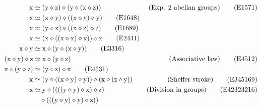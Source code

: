 \begin{align}
        \x &\formaleq (\y \op \z) \op (\y \op (\x \op \z)) & \hbox{(Exp. $2$ abelian groups)} \label{eq1571}\tag{E1571} \\
        \x &\formaleq (\x \op \y) \op ((\x \op \y) \op \y) \label{eq1648}\tag{E1648} \\
        \x &\formaleq (\y \op \x) \op ((\x \op \z) \op \z) \label{eq1689}\tag{E1689} \\
        \x &\formaleq (\x \op ((\x \op \x) \op \x)) \op \x \label{eq2441}\tag{E2441} \\
        \x \op \y &\formaleq \x \op (\y \op (\x \op \y)) \label{eq3316}\tag{E3316} \\
        (\x \op \y) \op \z &\formaleq \x \op (\y \op \z) &\hbox{(Associative law)} \label{eq4512}\tag{E4512}\\
        \x \op (\y \op \z) &\formaleq (\y \op \z) \op \x \label{eq4531}\tag{E4531} \\
        \x &\formaleq (\y \op ((\x \op \y) \op \y)) \op (\x \op (\z \op \y)) & \hbox{(Sheffer stroke)} \label{eq345169}\tag{E345169} \\
        \x &\formaleq \y \op ((((\y \op \y) \op \x) \op \z) & \hbox{(Division in groups)} \label{eq42323216}\tag{E42323216} \\
        & \quad  \op (((\y \op \y) \op \y) \op \z)) \nonumber
\end{align}
